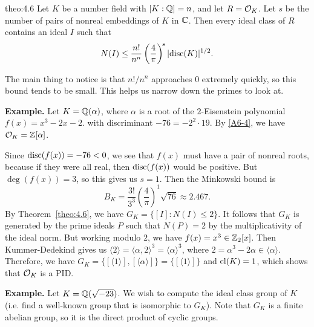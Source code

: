\begin{theo}[Minkowski]{theo:4.6}
    Let $K$ be a number field with $[K : \mathbb{Q}] = n$, and let $R = {\cal O}_K$.
    Let $s$ be the number of pairs of nonreal embeddings of $K$ in $\mathbb{C}$. 
    Then every ideal class of $R$ contains an ideal $I$ such that 
    \[ N(I) \leq \frac{n!}{n^n} \left( \frac{4}{\pi} \right)^{\!s} \lvert\operatorname{disc}(K)\rvert^{1/2}. \]
\end{theo}\vspace{-0.25cm}

The main thing to notice is that $n!/n^n$ approaches $0$ extremely quickly, 
so this bound tends to be small. This helps us narrow down the 
primes to look at. 

{\bf Example.} Let $K = \mathbb{Q}(\alpha)$, where $\alpha$ 
is a root of the $2$-Eisenstein polynomial $f(x) = x^3 - 2x - 2$. 
with discriminant $-76 = -2^2 \cdot 19$. By \ref{A6-4}, we have 
${\cal O}_K = \mathbb{Z}[\alpha]$. 

Since $\operatorname{disc}(f(x)) = -76 < 0$, we see that $f(x)$ must have a pair of 
nonreal roots, because if they were all real, then $\operatorname{disc}(f(x))$ would 
be positive. But $\deg(f(x)) = 3$, so this gives us $s = 1$. 
Then the Minkowski bound is 
\[ B_K = \frac{3!}{3^3} \left( \frac{4}{\pi} \right)^{\!1} \sqrt{76} \approx 2.467. \] 
By Theorem~\ref{theo:4.6}, we have $G_K = \{[I] : N(I) \leq 2\}$.
It follows that $G_K$ is generated by the prime ideals $P$ such that $N(P) = 2$
by the multiplicativity of the ideal norm.
But working modulo $2$, we have $f(x) = x^3 \in \mathbb{Z}_2[x]$. Then Kummer-Dedekind 
gives us $\langle 2 \rangle = \langle \alpha, 2 \rangle^3 = \langle \alpha \rangle^3$, 
where $2 = \alpha^3 - 2\alpha \in \langle \alpha \rangle$. Therefore, 
we have $G_K = \{[\langle 1 \rangle], [\langle \alpha \rangle]\} = 
\{[\langle 1 \rangle]\}$ and $\operatorname{cl}(K) = 1$, which shows that ${\cal O}_K$ 
is a PID. 

{\bf Example.} Let $K = \mathbb{Q}(\sqrt{-23})$. We wish to compute the ideal class 
group of $K$ (i.e. find a well-known group that is isomorphic to $G_K$). 
Note that $G_K$ is a finite abelian group, so it is the direct product 
of cyclic groups.


